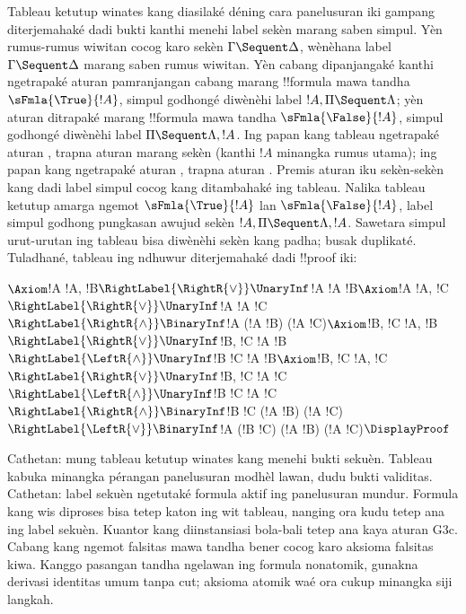 \documentclass[../../../include/open-logic-section]{subfiles}
\begin{document}
Tableau ketutup winates kang diasilaké déning cara panelusuran iki
gampang diterjemahaké dadi bukti  kanthi
menehi label sekèn marang saben simpul. Yèn
rumus-rumus wiwitan cocog karo sekèn
$\Gamma \Sequent \Delta$, wènèhana label
$\Gamma \Sequent \Delta$ marang saben rumus wiwitan.
Yèn cabang dipanjangaké kanthi ngetrapaké aturan
pamranjangan cabang marang !!{formula} mawa tandha
$\sFmla{\True}{!A}$, simpul godhongé diwènèhi label
$!A, \Pi \Sequent \Lambda$; yèn aturan ditrapaké
marang !!{formula} mawa tandha $\sFmla{\False}{!A}$,
simpul godhongé diwènèhi label
$\Pi \Sequent \Lambda, !A$. Ing papan kang tableau
ngetrapaké aturan \TRule{\True}{\star}, trapna
aturan \LeftR{\star} marang sekèn (kanthi $!A$
minangka rumus utama); ing papan kang ngetrapaké
aturan \TRule{\False}{\star}, trapna aturan
\RightR{\star}. Premis aturan iku sekèn-sekèn
kang dadi label simpul cocog kang ditambahaké ing
tableau. Nalika tableau ketutup amarga ngemot
$\sFmla{\True}{!A}$ lan $\sFmla{\False}{!A}$,
label simpul godhong pungkasan awujud sekèn
$!A, \Pi \Sequent \Lambda, !A$. Sawetara simpul
urut-urutan ing tableau bisa diwènèhi sekèn kang
padha; busak duplikaté. Tuladhané, tableau ing
ndhuwur diterjemahaké dadi !!{proof} iki:
\begin{maxwidth}
$
\Axiom$!A \fCenter !A, !B$
\RightLabel{\RightR{\lor}}
\UnaryInf$!A \fCenter !A \lor !B$
\Axiom$!A \fCenter !A, !C$
\RightLabel{\RightR{\lor}}
\UnaryInf$!A \fCenter !A \lor !C$
\RightLabel{\RightR{\land}}
\BinaryInf$!A \fCenter (!A \lor !B) \land (!A \lor !C)$
\Axiom$!B, !C \fCenter !A, !B$
\RightLabel{\RightR{\lor}}
\UnaryInf$!B, !C \fCenter !A \lor !B$
\RightLabel{\LeftR{\land}}
\UnaryInf$!B \land !C \fCenter !A \lor !B$
\Axiom$!B, !C \fCenter !A, !C$
\RightLabel{\RightR{\lor}}
\UnaryInf$!B, !C \fCenter !A \lor !C$
\RightLabel{\LeftR{\land}}
\UnaryInf$!B \land !C \fCenter !A \lor !C$
\RightLabel{\RightR{\land}}
\BinaryInf$!B \land !C \fCenter (!A \lor !B) \land
(!A \lor !C)$
\RightLabel{\LeftR{\lor}}
\BinaryInf$!A \lor (!B \land !C) \fCenter (!A \lor !B) \land
(!A \lor !C)$
\DisplayProof$
\end{maxwidth}
Cathetan: mung tableau ketutup winates kang menehi bukti sekuèn. Tableau kabuka minangka pérangan panelusuran modhèl lawan, dudu bukti validitas. Cathetan: label sekuèn ngetutaké formula aktif ing panelusuran mundur. Formula kang wis diproses bisa tetep katon ing wit tableau, nanging ora kudu tetep ana ing label sekuèn. Kuantor kang diinstansiasi bola-bali tetep ana kaya aturan G3c. Cabang kang ngemot falsitas mawa tandha bener cocog karo aksioma falsitas kiwa. Kanggo pasangan tandha ngelawan ing formula nonatomik, gunakna derivasi identitas umum tanpa cut; aksioma atomik waé ora cukup minangka siji langkah.
\end{document}
